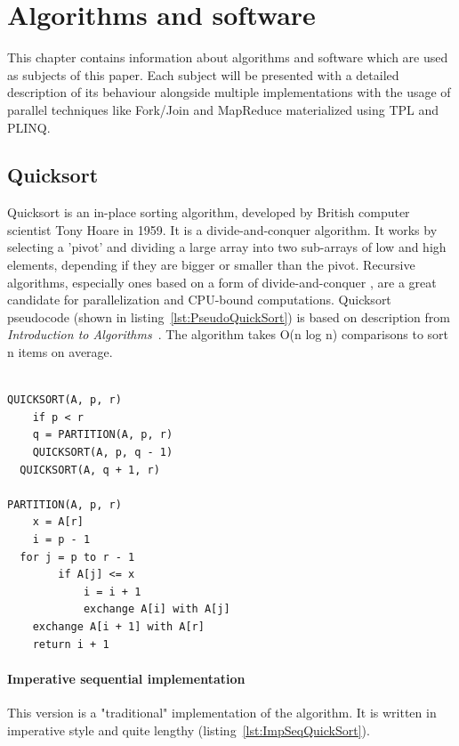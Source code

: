 \chapter{Algorithms and software}
\label{chap:4}
This chapter contains information about algorithms and software which are used as subjects of this paper. Each subject will be presented with a detailed description of its behaviour alongside multiple implementations with the usage of parallel techniques like Fork/Join and MapReduce materialized using TPL and PLINQ.

\section{Quicksort}
\label{sec: QuickSortImp}
Quicksort is an in-place sorting algorithm, developed by British computer scientist Tony Hoare in 1959. It is a divide-and-conquer algorithm. It works by selecting a 'pivot' and dividing a large array into two sub-arrays of low and high elements, depending if they are bigger or smaller than the pivot. Recursive algorithms, especially ones based on a form of divide-and-conquer , are a great candidate for parallelization and CPU-bound computations. Quicksort pseudocode (shown in listing~\ref{lst:PseudoQuickSort}) is based on description from \emph{Introduction to Algorithms}~\cite{Cormen2009}. The algorithm takes O(n log n) comparisons to sort n items on average.

\begin{lstlisting}[basicstyle=\ttfamily\small, caption={Sequential Quicksort pseudocode}, label={lst:PseudoQuickSort}]

QUICKSORT(A, p, r)
	if p < r
	q = PARTITION(A, p, r)
	QUICKSORT(A, p, q - 1)
  QUICKSORT(A, q + 1, r)
	
PARTITION(A, p, r)
	x = A[r]
	i = p - 1
  for j = p to r - 1
		if A[j] <= x
			i = i + 1
			exchange A[i] with A[j]
	exchange A[i + 1] with A[r]
	return i + 1
\end{lstlisting}

\subsubsection{Imperative sequential implementation}
This version is a "traditional" implementation of the algorithm. It is written in imperative style and quite lengthy (listing~\ref{lst:ImpSeqQuickSort}).


